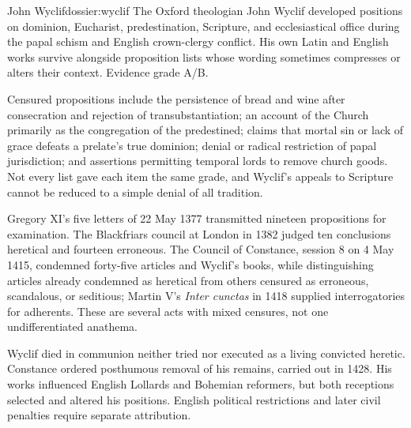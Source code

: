 \begin{heresydossier}{John Wyclif}{dossier:wyclif}
\objectfield The Oxford theologian John Wyclif developed positions on dominion, Eucharist, predestination, Scripture, and ecclesiastical office during the papal schism and English crown-clergy conflict. His own Latin and English works survive alongside proposition lists whose wording sometimes compresses or alters their context. Evidence grade A/B.

\propositionfield Censured propositions include the persistence of bread and wine after consecration and rejection of transubstantiation; an account of the Church primarily as the congregation of the predestined; claims that mortal sin or lack of grace defeats a prelate's true dominion; denial or radical restriction of papal jurisdiction; and assertions permitting temporal lords to remove church goods. Not every list gave each item the same grade, and Wyclif's appeals to Scripture cannot be reduced to a simple denial of all tradition.

\responsefield Gregory XI's five letters of 22 May 1377 transmitted nineteen propositions for examination. The Blackfriars council at London in 1382 judged ten conclusions heretical and fourteen erroneous. The Council of Constance, session 8 on 4 May 1415, condemned forty-five articles and Wyclif's books, while distinguishing articles already condemned as heretical from others censured as erroneous, scandalous, or seditious; Martin V's \emph{Inter cunctas} in 1418 supplied interrogatories for adherents. These are several acts with mixed censures, not one undifferentiated anathema.

\aftermathfield Wyclif died in communion neither tried nor executed as a living convicted heretic. Constance ordered posthumous removal of his remains, carried out in 1428. His works influenced English Lollards and Bohemian reformers, but both receptions selected and altered his positions. English political restrictions and later civil penalties require separate attribution.
\end{heresydossier}

